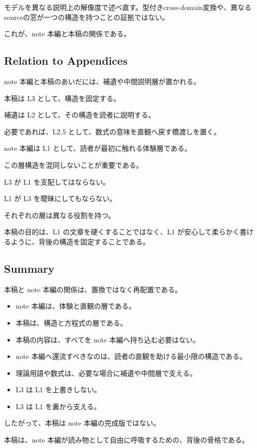 モデルを異なる説明上の解像度で述べ直す。型付きcross-domain変換や、異なるsourceの窓が一つの構造を持つことの証拠ではない。

これが、note 本編と本稿の関係である。

\subsection{Relation to Appendices}

note 本編と本稿のあいだには、補遺や中間説明層が置かれる。

本稿は L3 として、構造を固定する。

補遺は L2 として、その構造を読者に説明する。

必要であれば、L2.5 として、数式の意味を直観へ戻す橋渡しを置く。

note 本編は L1 として、読者が最初に触れる体験層である。

この層構造を混同しないことが重要である。

L3 が L1 を支配してはならない。

L1 が L3 を曖昧にしてもならない。

それぞれの層は異なる役割を持つ。

本稿の目的は、L1 の文章を硬くすることではなく、L1 が安心して柔らかく書けるように、背後の構造を固定することである。

\subsection{Summary}

本稿と note 本編の関係は、置換ではなく再配置である。

\begin{itemize}
\item note 本編は、体験と直観の層である。
\item 本稿は、構造と方程式の層である。
\item 本稿の内容は、すべてを note 本編へ持ち込む必要はない。
\item note 本編へ還流すべきなのは、読者の直観を助ける最小限の構造である。
\item 理論用語や数式は、必要な場合に補遺や中間層で支える。
\item L3 は L1 を上書きしない。
\item L3 は L1 を裏から支える。
\end{itemize}

したがって、本稿は note 本編の完成版ではない。

本稿は、note 本編が読み物として自由に呼吸するための、背後の骨格である。
